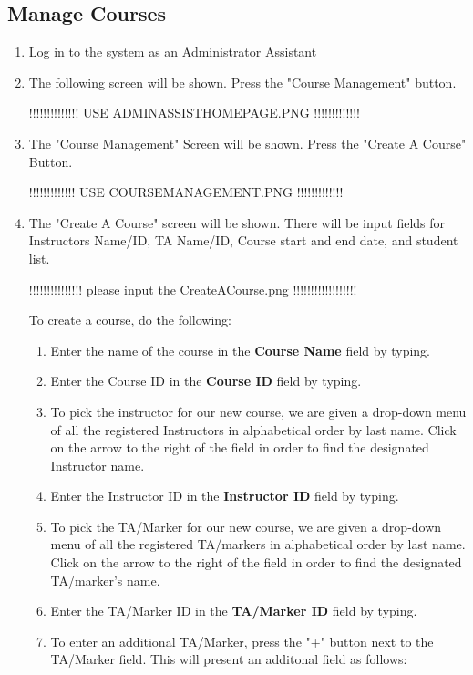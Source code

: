 \documentclass{article}
\begin{document}
\subsection{Manage Courses}
\begin{enumerate}
 \item Log in to the system as an Administrator Assistant
\item The following screen will be shown. Press the "Course Management" button.

!!!!!!!!!!!!!! USE ADMINASSISTHOMEPAGE.PNG    !!!!!!!!!!!!!

\item The "Course Management" Screen will be shown. Press the "Create A Course" Button.


!!!!!!!!!!!!! USE COURSEMANAGEMENT.PNG   !!!!!!!!!!!!!

\item The "Create A Course" screen will be shown. There will be input fields for Instructors Name/ID, TA Name/ID, Course start and end date, and student list.




!!!!!!!!!!!!!!! please input the CreateACourse.png !!!!!!!!!!!!!!!!!!



To create a course, do the following:
	\begin{enumerate}
	\item Enter the name of the course in the \textbf{Course Name} field by typing.
	\item Enter the Course ID in the \textbf{Course ID} field by typing.
	\item To pick the instructor for our new course, we are given a drop-down menu of all the registered Instructors in alphabetical order by last name. Click on the arrow to the right of the field in order to find the designated Instructor name.
	\item Enter the Instructor ID in the \textbf{Instructor ID} field by typing.
	\item To pick the TA/Marker for our new course, we are given a drop-down menu of all the registered TA/markers in alphabetical order by last name. Click on the arrow to the right of the field in order to find the designated TA/marker's name.
	\item Enter the TA/Marker ID in the \textbf{TA/Marker ID} field by typing.
	\item To enter an additional TA/Marker, press the "+" button next to the TA/Marker field. This will present  an additonal field as follows:


\end{enumerate}
\end{enumerate}
\end{document}
